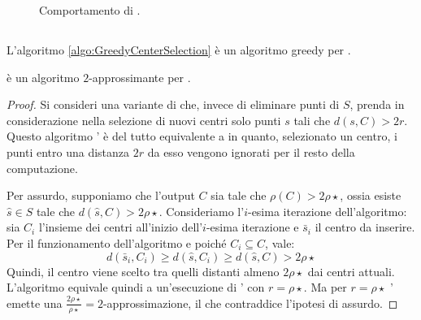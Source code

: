 \begin{figure}[ht]
	\centering
	
	\caption{Comportamento di \CenterSelectionPlus.}
	\label{fig:csplus_r_beh}
\end{figure}


\subsection{\GreedyCenterSelection}
L'algoritmo \ref{algo:GreedyCenterSelection} è un algoritmo greedy per \CenterSelection.

\begin{algorithm}
	\caption{\GreedyCenterSelection}
	
	\label{algo:GreedyCenterSelection}
\end{algorithm}

\begin{theorem}
	\GreedyCenterSelection è un algoritmo $2$-approssimante per \CenterSelection.
\end{theorem}
\begin{proof}
	Si consideri una variante di \CenterSelectionPlus che, invece di eliminare punti di $S$, prenda in considerazione nella selezione di nuovi centri solo punti $s$ tali che $d(s,C)>2r$.
	Questo algoritmo \CenterSelectionPlus' è del tutto equivalente a \CenterSelectionPlus in quanto, selezionato un centro, i punti entro una distanza $2r$ da esso vengono ignorati per il resto della computazione.

	Per assurdo, supponiamo che l'output $C$ sia tale che $\rho(C)>2\rho\star$, ossia esiste $\hat s\in S$ tale che $d(\hat s,C)> 2\rho\star$.
	Consideriamo l'$i$-esima iterazione dell'algoritmo: sia $C_i$ l'insieme dei centri all'inizio dell'$i$-esima iterazione e $\bar s_i$ il centro da inserire.
	Per il funzionamento dell'algoritmo e poiché $C_i\subseteq C$, vale:
	\begin{equation*}
		d(\bar s_i,C_i)\geq d(\hat s,C_i)\geq d(\hat s, C)>2\rho\star
	\end{equation*}
	Quindi, il centro viene scelto tra quelli distanti almeno $2\rho\star$ dai centri attuali.
	L'algoritmo equivale quindi a un'esecuzione di \CenterSelectionPlus' con $r=\rho\star$.
	Ma per $r=\rho\star$ \CenterSelectionPlus' emette una $\frac{2\rho\star}{\rho\star}=2$-approssimazione, il che contraddice l'ipotesi di assurdo.
\end{proof}


